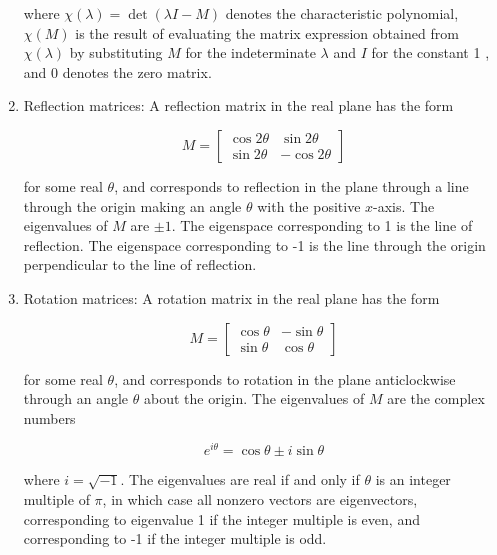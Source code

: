 \documentclass{article}
\begin{document}
\begin{enumerate}
    where $\chi(\lambda)=\operatorname{det}(\lambda I-M)$ denotes the characteristic polynomial, $\chi(M)$ is the result of evaluating the matrix expression obtained from $\chi(\lambda)$ by substituting $M$ for the indeterminate $\lambda$ and $I$ for the constant 1 , and 0 denotes the zero matrix.\\

    \item Reflection matrices: A reflection matrix in the real plane has the form

    $$
    M=\left[\begin{array}{rr}
    \cos 2 \theta & \sin 2 \theta \\
    \sin 2 \theta & -\cos 2 \theta
    \end{array}\right]
    $$

    for some real $\theta$, and corresponds to reflection in the plane through a line through the origin making an angle $\theta$ with the positive $x$-axis. The eigenvalues of $M$ are $\pm 1$. The eigenspace corresponding to 1 is the line of reflection. The eigenspace corresponding to -1 is the line through the origin perpendicular to the line of reflection.

    \item Rotation matrices: A rotation matrix in the real plane has the form

    $$
    M=\left[\begin{array}{rr}
    \cos \theta & -\sin \theta \\
    \sin \theta & \cos \theta
    \end{array}\right]
    $$

    for some real $\theta$, and corresponds to rotation in the plane anticlockwise through an angle $\theta$ about the origin. The eigenvalues of $M$ are the complex numbers

    $$
    e^{i \theta}=\cos \theta \pm i \sin \theta
    $$

    where $i=\sqrt{-1}$. The eigenvalues are real if and only if $\theta$ is an integer multiple of $\pi$, in which case all nonzero vectors are eigenvectors, corresponding to eigenvalue 1 if the integer multiple is even, and corresponding to -1 if the integer multiple is odd.

\end{enumerate}
\end{document}
